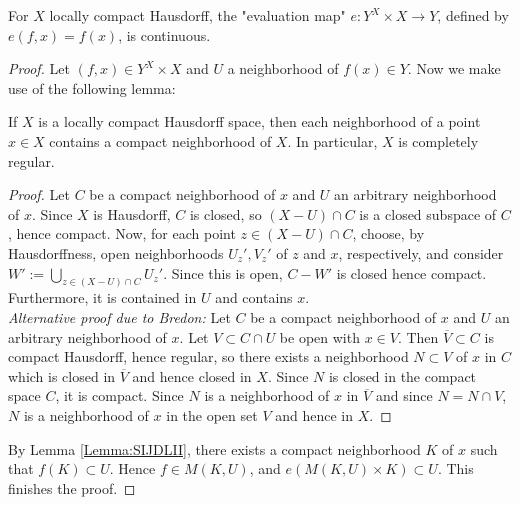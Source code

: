 \begin{proposition}[]\label{Prop:SJUSIO12}
    For $X$ locally compact Hausdorff, the
    "evaluation map" $e\colon Y^{X} \times X
    \to Y$, defined by $e\left( f,x \right) =
    f(x)$, is continuous.
\end{proposition}

\begin{proof}
    Let $\left( f,x \right) \in 
    Y^{X} \times X$ and
    $U$ a neighborhood of $f(x) \in  Y$.
    Now we make use of the following lemma:
    \begin{lemma}[]\label{Lemma:SIJDLII}
        If $X$ is a locally compact Hausdorff space, then
        each neighborhood of a point $x \in X$ contains
        a compact neighborhood of $X$.
        In particular, $X$ is completely regular.
    \end{lemma}

    \begin{proof}
        Let $C$ be a compact neighborhood of $x$ and
        $U$ an arbitrary neighborhood of $x$.
        Since $X$ is Hausdorff, $C$ is closed, so
        $\left( X - U \right) \cap C$ is a closed
        subspace of $C$, hence compact. Now,
        for each point $z \in (X-U) \cap C$, choose, by Hausdorffness,
        open neighborhoods $U_z',V_z'$ of $z$ and $x$, respectively,
        and consider $W' := \bigcup_{z \in (X-U)\cap C} 
        U_z'$. Since this is open,
        $C - W'$ is closed hence compact. Furthermore,
        it is contained in $U$ and contains $x$.\\
        \linebreak
        \textit{Alternative proof due to Bredon:}
        Let $C$ be a compact neighborhood of $x$ and
        $U$ an arbitrary neighborhood
        of $x$. Let $V \subset C \cap U$ be open with
        $x \in V$. Then $\overline{V} \subset C$ is compact
        Hausdorff, hence regular, so there exists
        a neighborhood $N \subset V$ of $x$ in
        $C$ which is closed in $\overline{V}$ 
        and hence closed in $X$. Since
        $N$ is closed in the compact space $C$, it
        is compact. Since $N$ is a neighborhood of
        $x$ in $\overline{V}$ and since
        $N = N \cap V$, $N$ is a neighborhood of $x$ in
        the open set $V$ and hence in $X$.
    \end{proof}

    By Lemma \ref{Lemma:SIJDLII}, 
    there exists a compact neighborhood $K$ of
    $x$ such that
    $f(K) \subset U$. Hence
    $f \in M\left( K,U \right) $, and
    $e \left( M \left( K, U \right) \times 
    K \right) \subset U$.
    This finishes the proof.
\end{proof}

